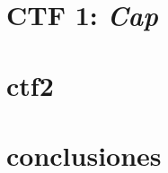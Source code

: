 \documentclass[a4paper, 12pt]{article} %
\begin{document}
\begin{otherlanguage}{spanish}
    \newpage
    \section{\acrshort{CTF} 1: \textit{Cap}}
    
    
    \newpage
    \section{ctf2}
    
    \newpage
    \section{conclusiones}
    
    \newpage
    \printbibliography[heading=bibnumbered] %

\end{otherlanguage}
\end{document}
